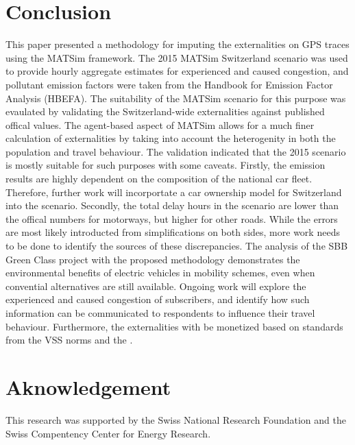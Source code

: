 \section{Conclusion}
This paper presented a methodology for imputing the externalities on GPS traces using the MATSim framework.
The 2015 MATSim Switzerland scenario was used to provide hourly aggregate estimates for experienced and caused congestion, and pollutant emission factors were taken from the Handbook for Emission Factor Analysis (HBEFA).
The suitability of the MATSim scenario for this purpose was evaulated by validating the Switzerland-wide externalities against published offical values.
The agent-based aspect of MATSim allows for a much finer calculation of externalities by taking into account the heterogenity in both the population and travel behaviour.
The validation indicated that the 2015 scenario is mostly suitable for such purposes with some caveats.
Firstly, the emission results are highly dependent on the composition of the national car fleet.
Therefore, further work will incorportate a car ownership model for Switzerland into the scenario.
Secondly, the total delay hours in the scenario are lower than the offical numbers for motorways, but higher for other roads.
While the errors are most likely introducted from simplifications on both sides, more work needs to be done to identify the sources of these discrepancies.
The analysis of the SBB Green Class project with the proposed methodology demonstrates the environmental benefits of electric vehicles in mobility schemes, even when convential alternatives are still available.
Ongoing work will explore the experienced and caused congestion of subscribers, and identify how such information can be communicated to respondents to influence their travel behaviour.
Furthermore, the externalities with be monetized based on standards from the VSS norms and the \citet{are2016externalcosts}.

\section{Aknowledgement}
This research was supported by the Swiss National Research Foundation and the Swiss Compentency Center for Energy Research.
